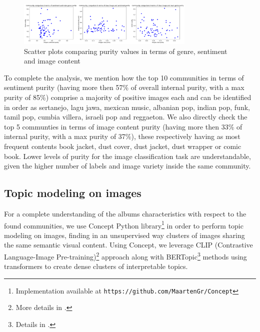 \documentclass[sigchi]{acmart}
\begin{document}
\begin{figure}[H]
\centering
\includegraphics[width=8.5cm]{img/scatters.png}
\caption{Scatter plots comparing purity values in terms of genre, sentiment and image content}
\label{fig: scatters}
\end{figure}

To complete the analysis, we mention how the top 10 communities in terms of sentiment purity (having more then 57\% of overall internal purity, with a max purity of 85\%) comprise a majority of positive images each and can be identified in order as sertanejo, lagu jawa, mexican music, albanian pop, indian pop, funk, tamil pop, cumbia villera, israeli pop and reggaeton. We also directly check the top 5 communties in terms of image content purity (having more then 33\% of internal purity, with a max purity of 37\%), these respectively having as most frequent contents book jacket,  dust cover, dust jacket, dust wrapper or comic book. Lower levels of purity for the image classification task are understandable, given the higher number of labels and image variety inside the same community.

\subsection{Topic modeling on images}
For a complete understanding of the albums characteristics with respect to the found communities, we use Concept Python library\footnote{Implementation available at \nolinkurl{https://github.com/MaartenGr/Concept}} in order to perform topic modeling on images, finding in an unsupervised way clusters of images sharing the same semantic visual content. Using Concept, we leverage CLIP (Contrastive Language-Image Pre-training)\footnote{More details in \cite{radford2021learning}.} approach along with BERTopic\footnote{Details in \cite{grootendorst2022bertopic}.} methods using transformers to create dense clusters of interpretable topics.
\end{document}
